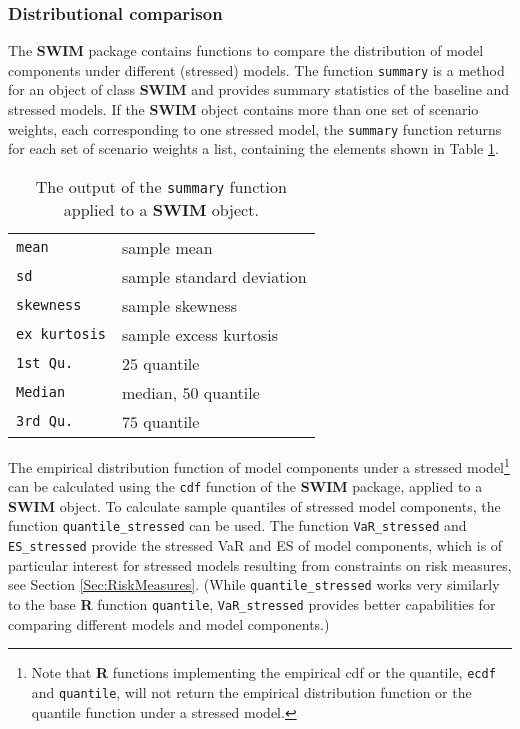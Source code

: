 \documentclass[
]{article}
\begin{document}
\hypertarget{distributional-comparison}{%
\subsubsection{Distributional comparison}\label{distributional-comparison}}

The \textbf{SWIM} package contains functions to compare the distribution of model components under different (stressed) models. The function \texttt{summary} is a method for an object of class \textbf{SWIM} and provides summary statistics of the baseline and stressed models. If the \textbf{SWIM} object contains more than one set of scenario weights, each corresponding to one stressed model, the \texttt{summary} function returns for each set of scenario weights a list, containing the elements shown in Table \ref{tab:summary}.

\begin{longtable}[]{@{}ll@{}}
\caption{\label{tab:summary} The output of the \texttt{summary} function applied to a \textbf{SWIM} object.}\tabularnewline
\toprule
\endhead
\texttt{mean} & sample mean\tabularnewline
\texttt{sd} & sample standard deviation\tabularnewline
\texttt{skewness} & sample skewness\tabularnewline
\texttt{ex\ kurtosis} & sample excess kurtosis\tabularnewline
\texttt{1st\ Qu.} & \(25%
\) quantile\tabularnewline
\texttt{Median} & median, \(50%
\) quantile\tabularnewline
\texttt{3rd\ Qu.} & \(75%
\) quantile\tabularnewline
\bottomrule
\end{longtable}

The empirical distribution function of model components under a stressed model\footnote{Note that \textbf{R} functions implementing the empirical cdf or the quantile, \texttt{ecdf} and \texttt{quantile}, will not return the empirical distribution function or the quantile function under a stressed model.} can be calculated using the \texttt{cdf} function of the \textbf{SWIM} package, applied to a \textbf{SWIM} object. To calculate sample quantiles of stressed model components, the function \texttt{quantile\_stressed} can be used. The function \texttt{VaR\_stressed} and \texttt{ES\_stressed} provide the stressed VaR and ES of model components, which is of particular interest for stressed models resulting from constraints on risk measures, see Section \ref{Sec:RiskMeasures}. (While \texttt{quantile\_stressed} works very similarly to the base \textbf{R} function \texttt{quantile}, \texttt{VaR\_stressed} provides better capabilities for comparing different models and model components.)
\end{document}
